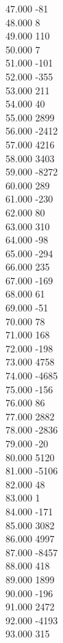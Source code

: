{ 47.000	-81 \\
 48.000	8 \\
 49.000	110 \\
 50.000	7 \\
 51.000	-101 \\
 52.000	-355 \\
 53.000	211 \\
 54.000	40 \\
 55.000	2899 \\
 56.000	-2412 \\
 57.000	4216 \\
 58.000	3403 \\
 59.000	-8272 \\
 60.000	289 \\
 61.000	-230 \\
 62.000	80 \\
 63.000	310 \\
 64.000	-98 \\
 65.000	-294 \\
 66.000	235 \\
 67.000	-169 \\
 68.000	61 \\
 69.000	-51 \\
 70.000	78 \\
 71.000	168 \\
 72.000	-198 \\
 73.000	4758 \\
 74.000	-4685 \\
 75.000	-156 \\
 76.000	86 \\
 77.000	2882 \\
 78.000	-2836 \\
 79.000	-20 \\
 80.000	5120 \\
 81.000	-5106 \\
 82.000	48 \\
 83.000	1 \\
 84.000	-171 \\
 85.000	3082 \\
 86.000	4997 \\
 87.000	-8457 \\
 88.000	418 \\
 89.000	1899 \\
 90.000	-196 \\
 91.000	2472 \\
 92.000	-4193 \\
 93.000	315 \\
}
